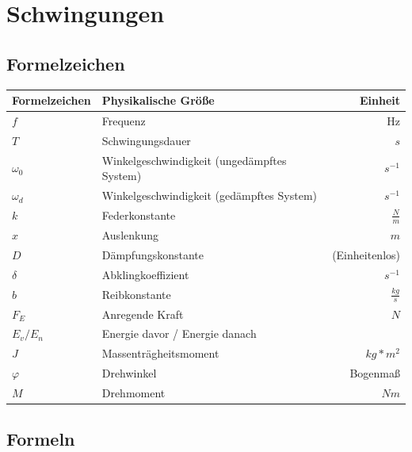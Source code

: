\documentclass[12pt, a4paper]{scrreprt}
\begin{document}

\tableofcontents
\listoffigures
\newpage
\linespread{1.5} %


\chapter{Schwingungen}

\section{Formelzeichen}

\begin{center}
  \makegapedcells
  \begin{tabular}{l | l | r}
    Formelzeichen & Physikalische Größe & Einheit\\
    \hline \hline
    \(f\) & Frequenz & Hz\\ \hline
    \(T\) & Schwingungsdauer & \(s\)\\ \hline
    \(\omega _0\) & Winkelgeschwindigkeit (ungedämpftes System) & \(s^{-1}\)\\ \hline
    \(\omega _d\) & Winkelgeschwindigkeit (gedämpftes System) & \(s^{-1}\)\\ \hline
    \(k\) & Federkonstante & \(\frac{N}{m}\)\\ \hline
    \(x\) & Auslenkung & \(m\)\\ \hline
    \(D\) & Dämpfungskonstante & (Einheitenlos)\\ \hline
    \(\delta\) & Abklingkoeffizient & \(s^{-1}\)\\ \hline
    \(b\) & Reibkonstante & \(\frac{kg}{s}\)\\ \hline
    \(F_E\) & Anregende Kraft & \(N\)\\ \hline
    \(E_v/E_n\) & Energie davor / Energie danach\\ \hline
    \(J\) & Massenträgheitsmoment & \(kg*m^2\)\\ \hline
    \(\varphi\) & Drehwinkel & Bogenmaß\\ \hline
    \(M\) & Drehmoment & \(Nm\)\\ \hline
  \end{tabular}
\end{center}


\section{Formeln}
\end{document}
